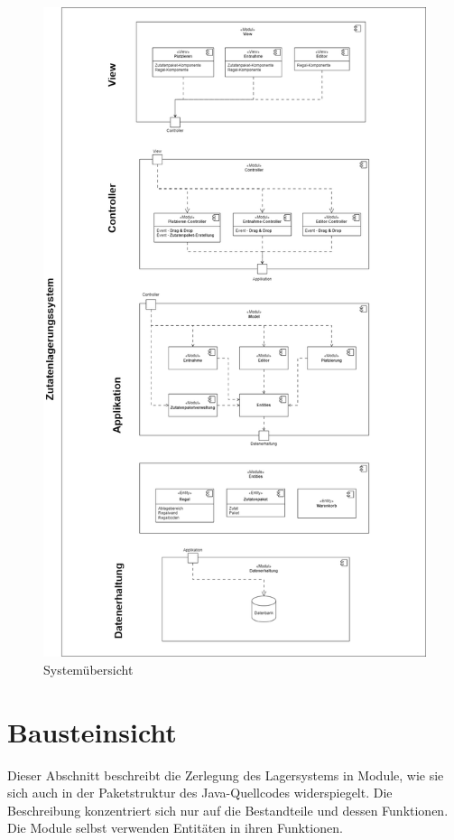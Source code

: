 \begin{figure}[H]
    \centering
    \includegraphics[width=1\textwidth]{Bilder/Kapitel/Bausteinsicht/Zutatenlagerungssystem}
    \caption{Systemübersicht}
    \label{fig:Systemuebersicht}
\end{figure}


\section{Bausteinsicht}
Dieser Abschnitt beschreibt die Zerlegung des Lagersystems in Module, wie sie sich auch in der Paketstruktur des
Java-Quellcodes widerspiegelt. Die Beschreibung konzentriert sich nur auf die Bestandteile und dessen Funktionen.
Die Module selbst verwenden Entitäten in ihren Funktionen.

